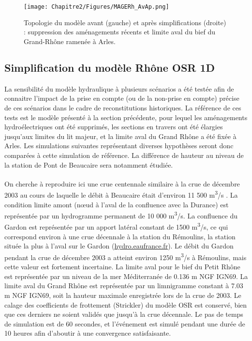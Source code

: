 	\begin{figure}[h]
	\centering
		\texttt{[image: Chapitre2/Figures/MAGERh\_AvAp.png]}
        \caption{Topologie du modèle avant (gauche) et après simplifications (droite) : suppression des aménagements récents et limite aval du bief du Grand-Rhône ramenée à Arles.}
		\label{fig:Mageavap}
	\end{figure}		
	
\FloatBarrier	
	\subsection{Simplification du modèle Rhône OSR 1D}
		
	\paragraph{} La sensibilité du modèle hydraulique à plusieurs scénarios a été testée afin de connaitre l'impact de la prise en compte (ou de la non-prise en compte) précise de ces scénarios dans le cadre de reconstitutions historiques. La référence de ces tests est le modèle présenté à la section précédente, pour lequel les aménagements hydroélectriques ont été supprimés, les sections en travers ont été élargies jusqu'aux limites du lit majeur, et la limite aval du Grand Rhône a été fixée à Arles. Les simulations suivantes représentant diverses hypothèses seront donc comparées à cette simulation de référence. La différence de hauteur au niveau de la station de Pont de Beaucaire sera notamment étudiée.
	
	\paragraph{} On cherche à reproduire ici une crue centennale similaire à la crue de décembre 2003 au cours de laquelle le débit à Beaucaire était d'environ 11 500 m\textsuperscript{3}/s \citep{medd_debit_2005}. La condition limite amont (nœud à l'aval de la confluence avec la Durance) est représentée par un hydrogramme permanent de 10 000 m\textsuperscript{3}/s. La confluence du Gardon est représentée par un apport latéral constant de 1500 m\textsuperscript{3}/s, ce qui correspond environ à une crue décennale à la station du Rémoulins, la station située la plus à l'aval sur le Gardon (\url{hydro.eaufrance.fr}). Le débit du Gardon pendant la crue de décembre 2003 a atteint environ 1250 m\textsuperscript{3}/s à Rémoulins, mais cette valeur est fortement incertaine. La limite aval pour le bief du Petit Rhône est représentée par un niveau de la mer Méditerranée de 0.136 m NGF IGN69. La limite aval du Grand Rhône est représentée par un limnigramme constant à 7.03 m NGF IGN69, soit la hauteur maximale enregistrée lors de la crue de 2003. Le calage des coefficients de frottement (Strickler) du modèle OSR \citep{launay_zabr-osr_2017} est conservé, bien que ces derniers ne soient validés que jusqu'à la crue décennale. Le pas de temps de simulation est de 60 secondes, et l'événement est simulé pendant une durée de 10 heures afin d'aboutir à une convergence satisfaisante.
	
